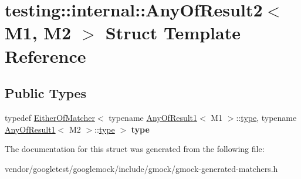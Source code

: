 \hypertarget{structtesting_1_1internal_1_1_any_of_result2}{}\section{testing\+:\+:internal\+:\+:Any\+Of\+Result2$<$ M1, M2 $>$ Struct Template Reference}
\label{structtesting_1_1internal_1_1_any_of_result2}
\subsection*{Public Types}
\begin{DoxyCompactItemize}
\item 
\mbox{\label{structtesting_1_1internal_1_1_any_of_result2_a6d9eba508021f8e652c7c154a649073f}} 
typedef \hyperlink{classtesting_1_1internal_1_1_either_of_matcher}{Either\+Of\+Matcher}$<$ typename \hyperlink{structtesting_1_1internal_1_1_any_of_result1}{Any\+Of\+Result1}$<$ M1 $>$\+::\hyperlink{classtesting_1_1internal_1_1_either_of_matcher}{type}, typename \hyperlink{structtesting_1_1internal_1_1_any_of_result1}{Any\+Of\+Result1}$<$ M2 $>$\+::\hyperlink{classtesting_1_1internal_1_1_either_of_matcher}{type} $>$ {\bfseries type}
\end{DoxyCompactItemize}


The documentation for this struct was generated from the following file\+:\begin{DoxyCompactItemize}
\item 
vendor/googletest/googlemock/include/gmock/gmock-\/generated-\/matchers.\+h\end{DoxyCompactItemize}
